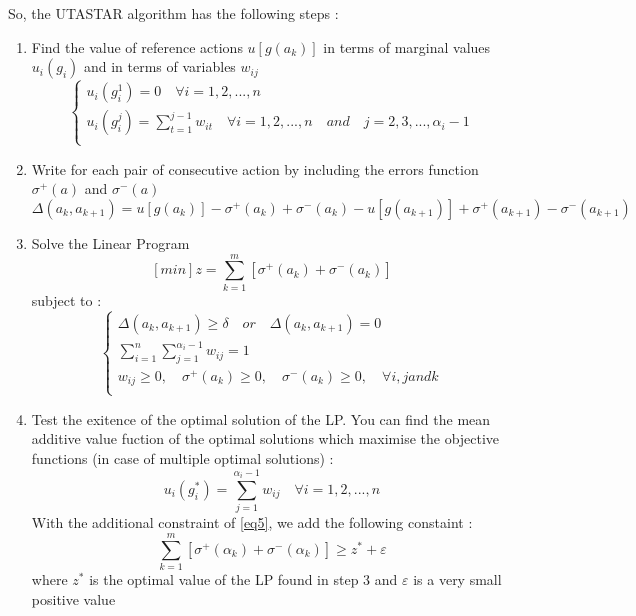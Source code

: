 \documentclass{report}
\begin{document}
So, the UTASTAR algorithm has the following steps :\\ 
\begin{enumerate}
\item Find the value of reference actions $u[g(a_k)]$ in terms of marginal values  $u_i(g_i)$ and in terms of variables  $w_{ij}$
\begin{equation}
      \begin{cases}
     	u_i(g_i^1) = 0 \quad \forall i = 1,2,...,n \\
	u_i(g_i^j) =	  \sum_{t=1}^{j-1} w_{it} \quad \forall i = 1,2,...,n \quad and \quad j = 2,3,...,\alpha _i -1 \\
      \end{cases}
\end{equation}
\item Write for each pair of consecutive action by including the errors function $\sigma ^{+} (a)$ and $\sigma ^{-} (a)$
\begin{equation}
	\Delta (a_k , a_{k+1}) = u[g(a_k)] - \sigma ^{+} (a_k) + \sigma ^{-} (a_k) -  u[g(a_{k+1})] + \sigma ^{+} (a_{k+1}) - \sigma ^{-} (a_{k+1})
\end{equation}
\item Solve the Linear Program
$$ [min]z = \sum_{k=1}^{m} [ \sigma ^{+} (a_k) + \sigma ^{-} (a_k)]  $$
subject to : \\
\begin{equation}\label{eq5}
      \begin{cases}
      	\Delta (a_k, a_{k+1} ) \geq \delta \quad or \quad \Delta (a_k, a_{k+1} ) = 0 \\
      	\sum_{i=1}^{n} \sum_{j=1}^{\alpha_i -1} w_{ij} = 1\\
       	w_{ij} \geq 0, \quad \sigma^{+}(a_k) \geq 0, \quad \sigma^{-}(a_k) \geq 0, \quad  \forall i, j  and  k\\
      \end{cases}
\end{equation}
\item Test the exitence of the optimal solution of the LP. You can find the mean additive value fuction of the optimal solutions which maximise the objective functions (in case of multiple optimal solutions) : 
\begin{equation}
	u_i(g_i^{*}) = \sum_{j=1}^{\alpha_i - 1} w_{ij} \quad \forall i = 1,2,...,n
\end{equation}
With the additional constraint of \eqref{eq5}, we add the following constaint : 
\begin{equation}
	\sum_{k=1}^{m} [ \sigma^{+} (\alpha _k) + \sigma ^{-}(\alpha _k)]  \geq z^{*} + \varepsilon 
\end{equation}
where $z^{*}$ is the optimal value of the LP found in step 3 and $\varepsilon$ is a very small positive value
\end{enumerate}
\end{document}
